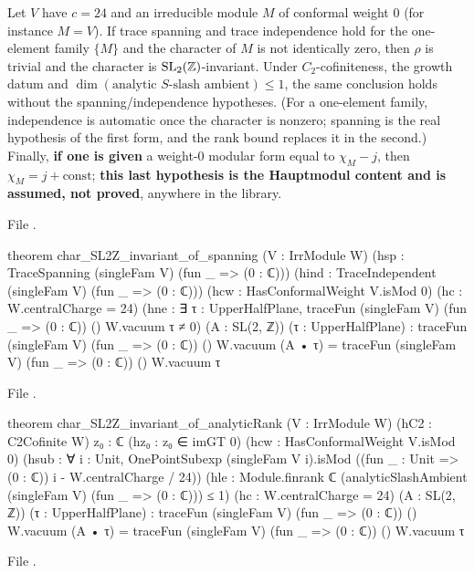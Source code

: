 \begin{theorem}[Zhu's theorem forces invariance of a $c=24$ weight-$0$ character]\label{l14:thm:moonsl2}
Let $V$ have $c = 24$ and an irreducible module $M$ of conformal weight $0$ (for instance $M = V$). If trace spanning and trace
independence hold for the one-element family $\{M\}$ and the character of $M$ is not identically zero, then $\rho$ is trivial and
the character is $\mathrm{SL}_2(\mathbb{Z})$-invariant. Under $C_2$-cofiniteness, the growth datum and $\dim(\text{analytic $S$-slash
ambient})\le1$, the same conclusion holds without the spanning/independence hypotheses. (For a one-element family,
independence is automatic once the character is nonzero; spanning is the real hypothesis of the first form, and the rank bound
replaces it in the second.) Finally, \textbf{if one is given} a weight-$0$ modular form equal to $\chi_M - j$, then $\chi_M = j +
\text{const}$; \textbf{this last hypothesis is the Hauptmodul content and is assumed, not proved}, anywhere in the library.
\end{theorem}
\noindent File .
\begin{leancode}
theorem char_SL2Z_invariant_of_spanning (V : IrrModule W)
    (hsp : TraceSpanning (singleFam V) (fun _ => (0 : ℂ)))
    (hind : TraceIndependent (singleFam V) (fun _ => (0 : ℂ)))
    (hcw : HasConformalWeight V.isMod 0) (hc : W.centralCharge = 24)
    (hne : ∃ τ : UpperHalfPlane, traceFun (singleFam V) (fun _ => (0 : ℂ)) () W.vacuum τ ≠ 0)
    (A : SL(2, ℤ)) (τ : UpperHalfPlane) :
    traceFun (singleFam V) (fun _ => (0 : ℂ)) () W.vacuum (A • τ)
      = traceFun (singleFam V) (fun _ => (0 : ℂ)) () W.vacuum τ
\end{leancode}
\noindent File .
\begin{leancode}
theorem char_SL2Z_invariant_of_analyticRank (V : IrrModule W) (hC2 : C2Cofinite W) {z₀ : ℂ}
    (hz₀ : z₀ ∈ imGT 0) (hcw : HasConformalWeight V.isMod 0)
    (hsub : ∀ i : Unit, OnePointSubexp (singleFam V i).isMod
      ((fun _ : Unit => (0 : ℂ)) i - W.centralCharge / 24))
    (hle : Module.finrank ℂ (analyticSlashAmbient (singleFam V) (fun _ => (0 : ℂ))) ≤ 1)
    (hc : W.centralCharge = 24)
    (A : SL(2, ℤ)) (τ : UpperHalfPlane) :
    traceFun (singleFam V) (fun _ => (0 : ℂ)) () W.vacuum (A • τ)
      = traceFun (singleFam V) (fun _ => (0 : ℂ)) () W.vacuum τ
\end{leancode}
\noindent File .

